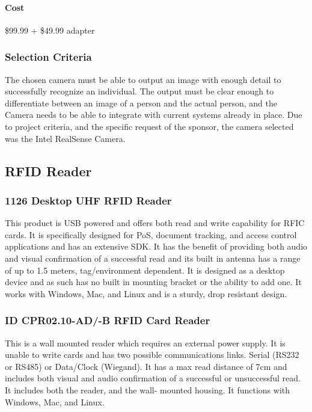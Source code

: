 \documentclass[10pt, onecolumn, twoside, peerreview]{IEEEtran}
\begin{document}
\paragraph{Cost} \$99.99 + \$49.99 adapter\\

\subsubsection{Selection Criteria}
The chosen camera must be able to output an image with enough detail to successfully recognize an individual. The
output must be clear enough to differentiate between an image of a person and the actual person, and the Camera needs
to be able to integrate with current systems already in place. Due to project criteria, and the specific request of the
sponsor, the camera selected was the Intel RealSense Camera.

\subsection{RFID Reader}

\subsubsection{1126 Desktop UHF RFID Reader}
This product is USB powered and offers both read and write capability for RFIC cards. It is specifically designed for
PoS, document tracking, and access control applications and has an extensive SDK. It has the benefit of providing both
audio and visual confirmation of a successful read and its built in antenna has a range of up to 1.5 meters,
tag/environment dependent. It is designed as a desktop device and as such has no built in mounting bracket or the
ability to add one. It works with Windows, Mac, and Linux and is a sturdy, drop resistant design.\\

\subsubsection{ID CPR02.10-AD/-B RFID Card Reader}
This is a wall mounted reader which requires an external power supply. It is unable to write cards and has two possible
communications links. Serial (RS232 or RS485) or Data/Clock (Wiegand). It has a max read distance of 7cm and includes
both visual and audio confirmation of a successful or unsuccessful read. It includes both the reader, and the wall-
mounted housing. It functions with Windows, Mac, and Linux.\\
\end{document}
